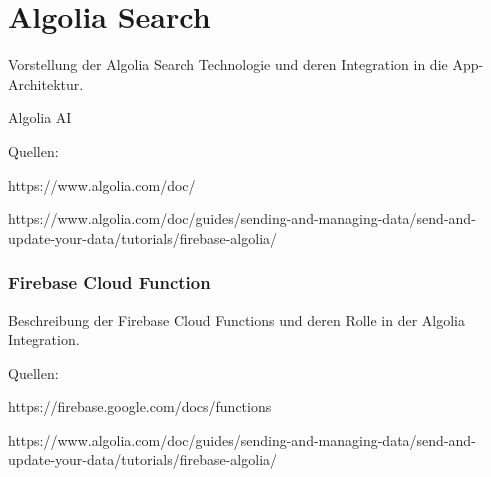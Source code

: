 \section{Algolia Search}

Vorstellung der Algolia Search Technologie und deren
Integration in die App-Architektur.

Algolia AI

Quellen:

https://www.algolia.com/doc/

https://www.algolia.com/doc/guides/sending-and-managing-data/send-and-update-your-data/tutorials/firebase-algolia/

\subsubsection{Firebase Cloud Function}

Beschreibung der Firebase Cloud Functions und deren Rolle in der Algolia Integration.

Quellen:

https://firebase.google.com/docs/functions

https://www.algolia.com/doc/guides/sending-and-managing-data/send-and-update-your-data/tutorials/firebase-algolia/
